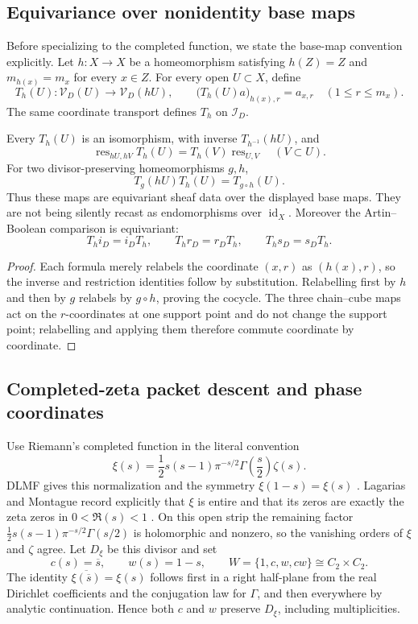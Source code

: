 \subsection{Equivariance over nonidentity base maps}

Before specializing to the completed function, we state the base-map convention
explicitly.  Let $h:X\to X$ be a homeomorphism satisfying $h(Z)=Z$ and
$m_{h(x)}=m_x$ for every $x\in Z$.  For every open $U\subset X$, define
\[
 T_h(U):\mathcal V_D(U)\longrightarrow\mathcal V_D(hU),
 \qquad
 \bigl(T_h(U)a\bigr)_{h(x),r}=a_{x,r}
 \quad(1\leq r\leq m_x).
\]
The same coordinate transport defines $T_h$ on $\mathcal I_D$.

\begin{proposition}
\label{prop:ds-equivariant-transport}
Every $T_h(U)$ is an isomorphism, with inverse $T_{h^{-1}}(hU)$, and
\[
 \operatorname{res}_{hU,hV}T_h(U)
 =T_h(V)\operatorname{res}_{U,V}
 \quad(V\subset U).
\]
For two divisor-preserving homeomorphisms $g,h$,
\[
 T_g(hU)T_h(U)=T_{g\circ h}(U).
\]
Thus these maps are equivariant sheaf data over the displayed base maps.  They
are not being silently recast as endomorphisms over $\operatorname{id}_X$.
Moreover the Artin--Boolean comparison is equivariant:
\[
 T_h i_D=i_D T_h,\qquad T_h r_D=r_D T_h,\qquad T_h s_D=s_D T_h.
\]
\end{proposition}

\begin{proof}
Each formula merely relabels the coordinate $(x,r)$ as $(h(x),r)$, so the inverse
and restriction identities follow by substitution.  Relabelling first by $h$ and
then by $g$ relabels by $g\circ h$, proving the cocycle.  The three chain--cube
maps act on the $r$-coordinates at one support point and do not change the support
point; relabelling and applying them therefore commute coordinate by coordinate.
\end{proof}

\subsection{Completed-zeta packet descent and phase coordinates}

Use Riemann's completed function in the literal convention
\[
 \xi(s)=\frac12s(s-1)\pi^{-s/2}\Gamma\!\left(\frac s2\right)\zeta(s).
\]
DLMF gives this normalization and the symmetry $\xi(1-s)=\xi(s)$
\cite[\S25.4, Eqs.~25.4.3--25.4.4]{apostolDLMF25}.  Lagarias and Montague
record explicitly that $\xi$ is entire and that its zeros are exactly the zeta
zeros in $0<\Re(s)<1$
\cite[\S1, Eq.~(1.1) and the following paragraph]{lagariasMontague2011}.
On this open strip the remaining factor
$\tfrac12s(s-1)\pi^{-s/2}\Gamma(s/2)$ is holomorphic and nonzero, so the
vanishing orders of $\xi$ and $\zeta$ agree.
Let $D_\xi$ be this divisor and set
\[
 c(s)=\overline s,\qquad w(s)=1-s,\qquad
 W=\{1,c,w,cw\}\cong C_2\times C_2.
\]
The identity $\overline{\xi(\overline s)}=\xi(s)$ follows first in a right
half-plane from the real Dirichlet coefficients and the conjugation law for
$\Gamma$, and then everywhere by analytic continuation.  Hence both $c$ and
$w$ preserve $D_\xi$, including multiplicities.

